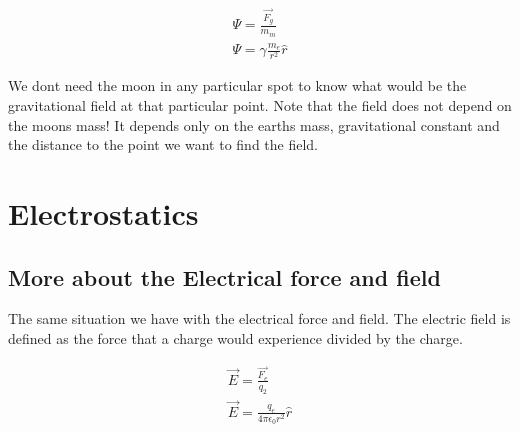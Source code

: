 \documentclass{ximera}
\begin{document}
\begin{eqnarray}
\Psi = \frac{\vec{F_g}}{m_m} \\
\Psi = \gamma \frac{m_e}{r^2} \hat{r}
\end{eqnarray} \label{gravitationalfield}


We dont need the moon in any particular spot to know what would be the gravitational field at that particular point. Note that the field does not depend on the moons mass! It depends only on the earths mass, gravitational constant and the distance to the point we want to find the field.



\section{Electrostatics}




\subsection{More about the Electrical force and field}

The same situation we have with the electrical force and field. The electric field  is defined as the force that a charge would experience divided by the charge.


\begin{eqnarray}
\vec{E} = \frac{\vec{F_e}}{q_2} \\
\vec{E} =  \frac{q_e}{4 \pi \epsilon_0 r^2} \hat{r}
\end{eqnarray} \label{electricfield}
\end{document}
